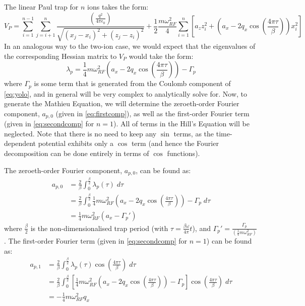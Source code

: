 \documentclass{article}
\begin{document}
\medskip
\noindent The linear Paul trap for $n$ ions takes the form:
\begin{equation}
	V_P = \sum_{i = 1}^{n - 1} \sum_{j = i + 1}^{n} \frac{\left( \frac{q^2}{4 \pi \epsilon_0} \right)}{\sqrt{(x_j - x_i)^2 + (z_j - z_i)^2}}  + \frac{1}{2} \frac{m \omega_{RF}^2}{4} \sum_{i = 1}^n [ a_z z_i^2 + (a_x - 2 q_x \cos(\frac{4 \pi \tau}{\beta}) ) x_i^2 ]
	\label{eq:yolo}
\end{equation}
In an analogous way to the two-ion case, we would expect that the eigenvalues of the corresponding Hessian matrix to $V_P$ would take the form:
\begin{equation}
	\lambda_p = \frac{1}{4} m \omega_{RF}^2 \left(a_x - 2 q_x \cos(\frac{4 \pi \tau}{\beta}) \right) - \Gamma_p
\end{equation}
where $\Gamma_p$ is some term that is generated from the Coulomb component of \eqref{eq:yolo}, and in general will be very complex to analytically solve for. Now, to generate the Mathieu Equation, we will determine the zeroeth-order Fourier component, $a_{p,0}$ (given in \eqref{eq:firstcomp}), as well as the first-order Fourier term (given in \eqref{eq:secondcomp} for $n = 1$). All of terms in the Hill's Equation will be neglected. Note that there is no need to keep any $\sin$ terms, as the time-dependent potential exhibits only a $\cos$ term (and hence the Fourier decomposition can be done entirely in terms of $\cos$ functions).\par
\medskip
\noindent The zeroeth-order Fourier component, $a_{p,0}$, can be found as:
\begin{align*}
a_{p,0} & = \frac{2}{\beta} \int_0^{\frac{\beta}{2}} \lambda_p (\tau) \; d \tau \\
& =  \frac{2}{\beta} \int_0^{\frac{\beta}{2}} \frac{1}{4} m \omega_{RF}^2 \left(a_x - 2 q_x \cos(\frac{4 \pi \tau}{\beta}) \right) - \Gamma_p \; d \tau \\
& = \frac{1}{4} m \omega_{RF}^2 \left( a_x - \Gamma_p' \right) 
\end{align*}
where $\frac{\beta}{2}$ is the non-dimensionalised trap period (with $\tau = \frac{\beta \omega}{4 \pi} t$), and $\Gamma_p' = \frac{\Gamma_p}{\left( \frac{1}{4} m \omega_{RF}^2 \right)}$. The first-order Fourier term (given in \eqref{eq:secondcomp} for $n = 1$) can be found as:
\begin{align*}
a_{p,1} & = \frac{2}{\beta} \int_0^{\frac{\beta}{2}} \lambda_p (\tau) \cos(\frac{4 \pi \tau}{\beta}) \; d \tau \\
& =  \frac{2}{\beta} \int_0^{\frac{\beta}{2}} \left[ \frac{1}{4} m \omega_{RF}^2 \left(a_x - 2 q_x \cos(\frac{4 \pi \tau}{\beta}) \right) - \Gamma_p \right] \cos(\frac{4 \pi \tau}{\beta}) \; d \tau \\
& = - \frac{1}{4} m \omega_{RF}^2 q_x 
\end{align*}
\end{document}
